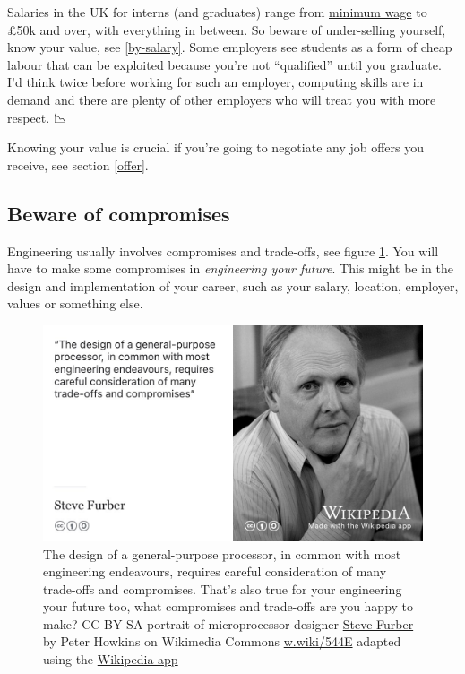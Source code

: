 \documentclass[
]{book}
\begin{document}
Salaries in the UK for interns (and graduates) range from \href{https://www.gov.uk/national-minimum-wage}{minimum wage} to £50k and over, with everything in between. So beware of under-selling yourself, know your value, see \ref{by-salary}. Some employers see students as a form of cheap labour that can be exploited because you're not ``qualified'' until you graduate. I'd think twice before working for such an employer, computing skills are in demand and there are plenty of other employers who will treat you with more respect. 📉

Knowing your value is crucial if you're going to negotiate any job offers you receive, see section \ref{offer}.

\hypertarget{compromises}{%
\subsection{Beware of compromises}\label{compromises}}

Engineering usually involves compromises and trade-offs, see figure \ref{fig:furber-fig}. You will have to make some compromises in \emph{engineering your future}. This might be in the design and implementation of your career, such as your salary, location, employer, values or something else.

\begin{figure}

{\centering \includegraphics[width=0.98\linewidth]{images/steve-furber} 

}

\caption{The design of a general-purpose processor, in common with most engineering endeavours, requires careful consideration of many trade-offs and compromises. \citep{furberarm} That's also true for your engineering your future too, what compromises and trade-offs are you happy to make? CC BY-SA portrait of microprocessor designer \href{https://en.wikipedia.org/wiki/Steve_Furber}{Steve Furber} by Peter Howkins on Wikimedia Commons \href{https://w.wiki/544E}{w.wiki/544E} adapted using the \href{https://apps.apple.com/gb/app/wikipedia/id324715238}{Wikipedia app}}\label{fig:furber-fig}
\end{figure}
\end{document}
